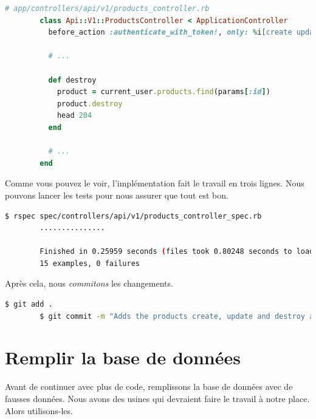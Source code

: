 \documentclass[]{report}
\begin{document}
      \begin{scriptsize}
        \begin{lstlisting}[language=ruby, caption={Implémentation de suppression des produits}, label={lst:create_destroy_products_controller}]
        # app/controllers/api/v1/products_controller.rb
        class Api::V1::ProductsController < ApplicationController
          before_action :authenticate_with_token!, only: %i[create update destroy]

          # ...

          def destroy
            product = current_user.products.find(params[:id])
            product.destroy
            head 204
          end

          # ...
        end
        \end{lstlisting}
      \end{scriptsize}

      Comme vous pouvez le voir, l'implémentation fait le travail en trois lignes. Nous pouvons lancer les tests pour nous assurer que tout est bon.

      \begin{scriptsize}
        \begin{lstlisting}[language=bash]
        $ rspec spec/controllers/api/v1/products_controller_spec.rb
        ...............

        Finished in 0.25959 seconds (files took 0.80248 seconds to load)
        15 examples, 0 failures
        \end{lstlisting}
      \end{scriptsize}

      Après cela, nous \textit{commitons} les changements.

      \begin{scriptsize}
        \begin{lstlisting}[language=bash]
        $ git add .
        $ git commit -m "Adds the products create, update and destroy action nested on the user resources"
        \end{lstlisting}
      \end{scriptsize}

  \section{Remplir la base de données}

    Avant de continuer avec plus de code, remplissons la base de données avec de fausses données. Nous avons des usines qui devraient faire le travail à notre place. Alors utilisons-les.
\end{document}
